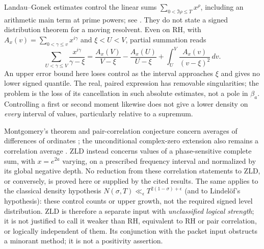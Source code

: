 Landau--Gonek estimates control the linear sums
$\sum_{0<\Im\rho\le T}x^\rho$, including an arithmetic main term
at prime powers; see \cite[Introduction, (1.1)]{Aryan2019}.
They do not state a signed distribution theorem for a moving resolvent.
Even on RH, with $A_x(v)=\sum_{0<\gamma\le v}x^{i\gamma}$ and
$\xi<U<V$, partial summation reads
\[
 \sum_{U<\gamma\le V}\frac{x^{i\gamma}}{\gamma-\xi}
 =\frac{A_x(V)}{V-\xi}-\frac{A_x(U)}{U-\xi}
       +\int_U^V\frac{A_x(v)}{(v-\xi)^2}\,dv.
\]
An upper error bound here loses control as the interval approaches
$\xi$ and gives no lower signed quantile. The real, paired expression
has removable singularities; the problem is the loss of its cancellation
in such absolute estimates, not a pole in $\beta_a$. Controlling a
first or second moment likewise does not give a lower density on
\emph{every} interval of values, particularly relative to a supremum.

Montgomery's theorem and pair-correlation conjecture concern averages
of differences of ordinates \cite{Montgomery1973}; the unconditional
complex-zero extension also remains a correlation average
\cite[Theorem 1]{BaluyotEtAl2023}. ZLD instead concerns values of a
phase-sensitive complete sum, with $x=e^{2a}$ varying, on a prescribed
frequency interval and normalized by its global negative depth. No
reduction from these correlation statements to ZLD, or conversely, is
proved here or supplied by the cited results. The same applies to the
classical density hypothesis
$N(\sigma,T)\ll_\epsilon T^{2(1-\sigma)+\epsilon}$ (and to
Lindel\"of's hypothesis): these control counts or upper growth, not the
required signed level distribution. ZLD is therefore a separate input
with \emph{unclassified logical strength}; it is not justified to call
it weaker than RH, equivalent to RH or pair correlation, or logically
independent of them. Its conjunction with the packet input obstructs
a minorant method; it is not a positivity assertion.

